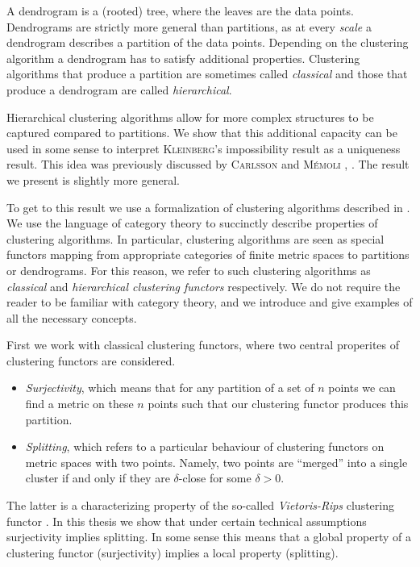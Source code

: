 A dendrogram is a (rooted) tree, where the leaves are the data points. Dendrograms are strictly more general than partitions, as at every \emph{scale} a dendrogram describes a partition of the data points.
Depending on the clustering algorithm a dendrogram has to satisfy additional properties.
Clustering algorithms that produce a partition are sometimes called \emph{classical} and those that produce a dendrogram are called \emph{hierarchical}.


Hierarchical clustering algorithms allow for more complex structures to be captured compared to partitions. We show that this additional capacity can be used in some sense to interpret \textsc{Kleinberg}'s impossibility result as a uniqueness result. This idea was previously discussed by \textsc{Carlsson} and \textsc{M\'emoli} \cite{JMLR:v11:carlsson10a}, \cite{Carlsson2010}. The result we present is slightly more general.

To get to this result we use a formalization of clustering algorithms described in \cite{Carlsson2010}. We use the language of category theory to succinctly describe properties of clustering algorithms. In particular, clustering algorithms are seen as special functors mapping from appropriate categories of finite metric spaces to partitions or dendrograms. For this reason, we refer to such clustering algorithms as \emph{classical} and \emph{hierarchical clustering functors} respectively. We do not require the reader to be familiar with category theory, and we introduce and give examples of all the necessary concepts.

First we work with classical clustering functors, where two central properites of clustering functors are considered.
\begin{itemize}
    \item \emph{Surjectivity}, which means that for any partition of a set of $n$ points we can find a metric on these $n$ points such that our clustering functor produces this partition.
    \item \emph{Splitting}, which refers to a particular behaviour of clustering functors on metric spaces with two points. Namely, two points are ``merged'' into a single cluster if and only if they are $\delta$-close for some $\delta > 0$.
\end{itemize}

The latter is a characterizing property of the so-called \emph{Vietoris-Rips} clustering functor \cite[Thm.~6.4]{Carlsson2010}.
In this thesis we show that under certain technical assumptions surjectivity implies splitting. In some sense this means that a global property of a clustering functor (surjectivity) implies a local property (splitting).

